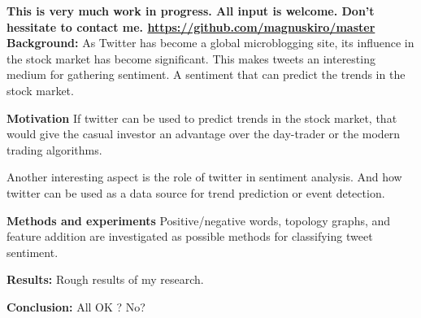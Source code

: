 \textbf{
This is very much work in progress. All input is welcome.
Don't hessitate to contact me. \url{https://github.com/magnuskiro/master} 
}\\

\textbf{Background:}
As Twitter has become a global microblogging site, its influence in the stock
market has become significant. This makes tweets an interesting medium for
gathering sentiment. A sentiment that can predict the trends in the stock
market. 

\textbf{Motivation} 
If twitter can be used to predict trends in the stock market, that would give
the casual investor an advantage over the day-trader or the modern trading algorithms. 

Another interesting aspect is the role of twitter in sentiment
analysis. And how twitter can be used as a data source for trend prediction or
event detection.  

\textbf{Methods and experiments} 
Positive/negative words, topology graphs, and feature addition are investigated
as possible methods for classifying tweet sentiment. 

\textbf{Results:} 
Rough results of my research. 

\textbf{Conclusion:} 
All OK ? No? 

